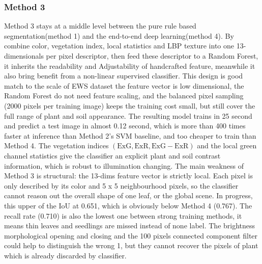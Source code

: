 \documentclass[conference]{IEEEtran}
\begin{document}
\subsubsection{Method 3}
Method 3 stays at a middle level between the pure rule based segmentation(method 1) and the end-to-end deep learning(method 4). By combine color, vegetation index, local statistics and LBP texture into one 13-dimensionals per pixel descriptor, then feed these descriptor to a Random Forest, it inherits the readability and Adjustability of handcrafted feature, meanwhile it also bring benefit from a non-linear supervised classifier. This design is good match to the scale of EWS dataset the feature vector is low dimensional, the Random Forest do not need feature scaling, and the balanced pixel sampling (2000 pixels per training image) keeps the training cost small, but still cover the full range of plant and soil appearance. The resulting model trains in 25 second and predict a test image in almost 0.12 second, which is more than 400 times faster at inference than Method 2’s SVM baseline, and too cheaper to train than Method 4. The vegetation indices $(\mathrm{ExG}, \mathrm{ExR}, \mathrm{ExG} - \mathrm{ExR})$ and the local green channel statistics give the classifier an explicit plant and soil contrast information, which is robust to illumination changing.
The main weakness of Method 3 is structural: the 13-dims feature vector is strictly local. Each pixel is only described by its color and 5 x 5 neighbourhood pixels, so the classifier cannot reason out the overall shape of one leaf, or the global scene. In progress, this upper of the IoU at 0.651, which is obviously below Method 4 (0.767). The recall rate (0.710) is also the lowest one between strong training methods, it means thin leaves and seedlings are missed instead of none label. The brightness morphological opening and closing and the 100 pixels connected component filter could help to distinguish the wrong 1, but they cannot recover the pixels of plant which is already discarded by classifier.
\end{document}
